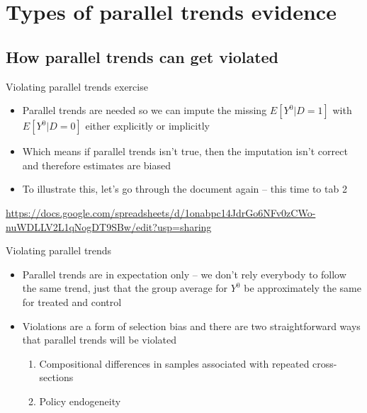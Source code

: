 \documentclass{beamer}
\begin{document}
\section{Types of parallel trends evidence}

\subsection{How parallel trends can get violated}




\begin{frame}{Violating parallel trends exercise}

\begin{itemize}
\item Parallel trends are needed so we can impute the missing $E[Y^0|D=1]$ with $E[Y^0|D=0]$ either explicitly or implicitly
\item Which means if parallel trends isn't true, then the imputation isn't correct and therefore estimates are biased
\item To illustrate this, let's go through the document again -- this time to tab 2
\end{itemize}

\url{https://docs.google.com/spreadsheets/d/1onabpc14JdrGo6NFv0zCWo-nuWDLLV2L1qNogDT9SBw/edit?usp=sharing}

\end{frame}


\begin{frame}{Violating parallel trends}

\begin{itemize}
\item Parallel trends are in expectation only -- we don't rely everybody to follow the same trend, just that the group average for $Y^0$ be approximately the same for treated and control 
\item Violations are a form of selection bias and there are two straightforward ways that parallel trends will be violated
	\begin{enumerate}
	\item Compositional differences in samples associated with repeated cross-sections
	\item Policy endogeneity
	\end{enumerate}
\end{itemize}

\end{frame}
\end{document}
